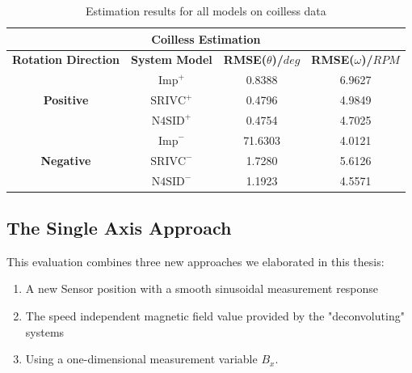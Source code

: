 \documentclass[english]{isasthesis}
\begin{document}
	\begin{table}[t]
	\begin{tabular}{|c|c|c|c|}
	\hline
	\multicolumn{4}{|c|}{\textbf{Coilless Estimation}}                                                                         	\\ \hline\hline
	\textbf{Rotation Direction}        & \textbf{System Model} & \textbf{RMSE($\theta$)/$deg$} & 		\textbf{RMSE($\omega$)/$RPM$} \\ \hline
	\multirow{3}{*}{\textbf{Positive}} & $\textrm{Imp}^+$               & 0.8388 	& 6.9627                       \\ \cline{2-4} 
	                                   & $\textrm{SRIVC}^+$             & 0.4796 	& 4.9849 \\ \cline{2-4} 
	                                   & $\textrm{N4SID}^+$             & 0.4754                        	& 4.7025                       \\ \hline
	\multirow{3}{*}{\textbf{Negative}} & $\textrm{Imp}^-$               & 71.6303                       	& 4.0121                       \\ \cline{2-4} 
	                                   & $\textrm{SRIVC}^-$             & 1.7280                        	& 5.6126                       \\ \cline{2-4} 
	                                   & $\textrm{N4SID}^-$             & 1.1923                        	& 4.5571                       \\ \hline
	\end{tabular}
	\caption{Estimation results for all models on coilless data}
	\label{table:coilless estimation}
	\end{table}
  			\subsection{The Single Axis Approach}
  			This evaluation combines three new approaches we elaborated in this thesis:
  			\begin{enumerate}
  			\item A new Sensor position with a smooth sinusoidal measurement response
  			\item The speed independent magnetic field value provided by the "deconvoluting" systems
  			\item Using a one-dimensional measurement variable $B_x$.
  			\end{enumerate}
  			
\end{document}

